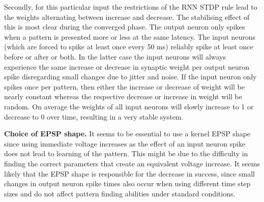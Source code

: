 \documentclass[10pt,a4paper,onecolumn]{article}
\begin{document}
Secondly, for this particular input the restrictions of the RNN STDP
rule lead to the weights alternating between increase and decrease. The
stabilising effect of this is most clear during the converged phase. The
output neuron only spikes when a pattern is presented more or less at
the same latency. The input neurons (which are forced to spike at least
once every 50 ms) reliably spike at least once before or after or both.
In the latter case the input neurons will always experience the same
increase or decrease in synaptic weight per output neuron spike
disregarding small changes due to jitter and noise. If the input neuron
only spikes once per pattern, then either the increase or decrease of
weight will be nearly constant whereas the respective decrease or
increase in weight will be random. On average the weights of all input
neurons will slowly increase to 1 or decrease to 0 over time, resulting
in a very stable system.

\textbf{Choice of EPSP shape.} It seems to be essential to use a kernel
EPSP shape since using immediate voltage increases as the effect of an
input neuron spike does not lead to learning of the pattern. This might
be due to the difficulty in finding the correct parameters that create
an equivalent voltage increase. It seems likely that the EPSP shape is
responsible for the decrease in success, since small changes in output
neuron spike times also occur when using different time step sizes and
do not affect pattern finding abilities under standard conditions.

{\sffamily \small
  \printbibliography[title=References]
}
\end{document}
